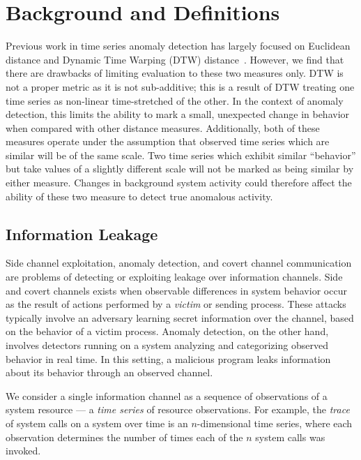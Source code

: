 \documentclass[a4paper]{article}
\theoremstyle{def}
\theoremstyle{thm}
\begin{document}
\section{Background and Definitions}
\label{sec:definitions}
\label{sec:background}

Previous work in time series anomaly detection has largely focused on Euclidean distance and Dynamic Time Warping (DTW) distance~\cite{many,papers,by,those,guys}.
However, we find that there are drawbacks of limiting evaluation to these two measures only.
DTW is not a proper metric as it is not sub-additive; this is a result of DTW treating one time series as non-linear time-stretched of the other.
In the context of anomaly detection, this limits the ability to mark a small, unexpected change in behavior when compared with other distance measures.
Additionally, both of these measures operate under the assumption that observed time series which are similar will be of the same scale.
Two time series which exhibit similar ``behavior'' but take values of a slightly different scale will not be marked as being similar by either measure.
Changes in background system activity could therefore affect the ability of these two measure to detect true anomalous activity.


\subsection{Information Leakage}
\label{subsec:information_leakage}
Side channel exploitation, anomaly detection, and covert channel communication are problems of detecting or exploiting leakage over information channels.
Side and covert channels exists when observable differences in system behavior occur as the result of actions performed by a \textit{victim} or sending process.
These attacks typically involve an adversary learning secret information over the channel, based on the behavior of a victim process.
Anomaly detection, on the other hand, involves detectors running on a system analyzing and categorizing observed behavior in real time.
In this setting, a malicious program leaks information about its behavior through an observed channel.

We consider a single information channel as a sequence of observations of a system resource --- a \textit{time series} of resource observations.
For example, the \textit{trace} of system calls on a system over time is an $n$-dimensional time series, where each observation determines the number of times each of the $n$ system calls was invoked.
\end{document}
